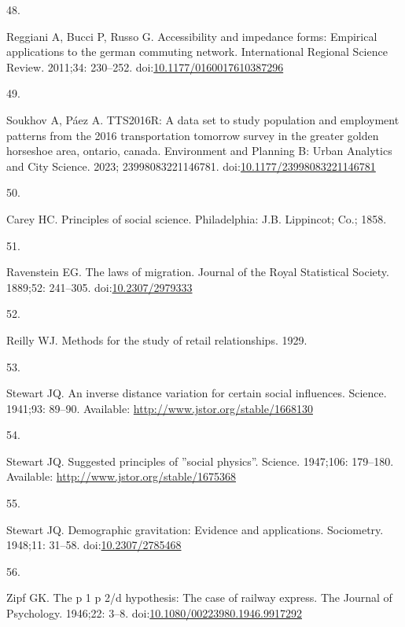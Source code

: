 \documentclass[10pt,letterpaper]{article}
\newlength{\cslhangindent}
\newlength{\csllabelwidth}
\newlength{\cslentryspacingunit} %
\newenvironment{CSLReferences}[2] %
 {%
  \setlength{\parindent}{0pt}
  \ifodd #1
  \let\oldpar\par
  \def\par{\hangindent=\cslhangindent\oldpar}
  \fi
  \setlength{\parskip}{#2\cslentryspacingunit}
 }%
 {}
\newcommand{\CSLLeftMargin}[1]{\parbox[t]{\csllabelwidth}{#1}}
\newcommand{\CSLRightInline}[1]{\parbox[t]{\linewidth - \csllabelwidth}{#1}\break}
\begin{document}
\begin{CSLReferences}{0}{0}
\leavevmode{}%
\CSLLeftMargin{48. }%
\CSLRightInline{Reggiani A, Bucci P, Russo G. Accessibility and
impedance forms: Empirical applications to the german commuting network.
International Regional Science Review. 2011;34: 230--252.
doi:\href{https://doi.org/10.1177/0160017610387296}{10.1177/0160017610387296}}

\leavevmode{}%
\CSLLeftMargin{49. }%
\CSLRightInline{Soukhov A, Páez A. {TTS}2016R: A data set to study
population and employment patterns from the 2016 transportation tomorrow
survey in the greater golden horseshoe area, ontario, canada.
Environment and Planning B: Urban Analytics and City Science. 2023;
23998083221146781.
doi:\href{https://doi.org/10.1177/23998083221146781}{10.1177/23998083221146781}}

\leavevmode{}%
\CSLLeftMargin{50. }%
\CSLRightInline{Carey HC. Principles of social science. Philadelphia:
J.B. Lippincot; Co.; 1858. }

\leavevmode{}%
\CSLLeftMargin{51. }%
\CSLRightInline{Ravenstein EG. The laws of migration. Journal of the
Royal Statistical Society. 1889;52: 241--305.
doi:\href{https://doi.org/10.2307/2979333}{10.2307/2979333}}

\leavevmode{}%
\CSLLeftMargin{52. }%
\CSLRightInline{Reilly WJ. Methods for the study of retail
relationships. 1929. }

\leavevmode{}%
\CSLLeftMargin{53. }%
\CSLRightInline{Stewart JQ. An inverse distance variation for certain
social influences. Science. 1941;93: 89--90. Available:
\url{http://www.jstor.org/stable/1668130}}

\leavevmode{}%
\CSLLeftMargin{54. }%
\CSLRightInline{Stewart JQ. Suggested principles of ''social physics''.
Science. 1947;106: 179--180. Available:
\url{http://www.jstor.org/stable/1675368}}

\leavevmode{}%
\CSLLeftMargin{55. }%
\CSLRightInline{Stewart JQ. Demographic gravitation: Evidence and
applications. Sociometry. 1948;11: 31--58.
doi:\href{https://doi.org/10.2307/2785468}{10.2307/2785468}}

\leavevmode{}%
\CSLLeftMargin{56. }%
\CSLRightInline{Zipf GK. The p 1 p 2/d hypothesis: The case of railway
express. The Journal of Psychology. 1946;22: 3--8.
doi:\href{https://doi.org/10.1080/00223980.1946.9917292}{10.1080/00223980.1946.9917292}}


\end{CSLReferences}
\end{document}
